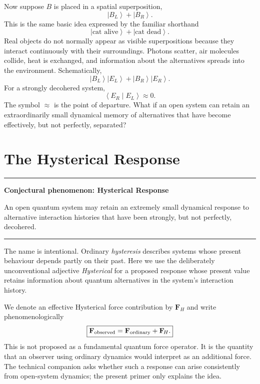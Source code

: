 \documentclass[11pt]{article}
\newcommand{\FH}{\mathbf F_{\!H}}
\newcommand{\ket}[1]{\left|#1\right\rangle}
\newcommand{\braket}[2]{\left\langle#1\middle|#2\right\rangle}
\newenvironment{plainbox}[1]{\begin{center}\begin{minipage}{0.91\textwidth}\hrule\vspace{0.55em}\textbf{#1}\par\smallskip}{\vspace{0.55em}\hrule\end{minipage}\end{center}}
\begin{document}
Now suppose $B$ is placed in a spatial superposition,
\begin{equation}
\ket{B_L}+\ket{B_R}.
\end{equation}
This is the same basic idea expressed by the familiar shorthand
\begin{equation}
\ket{\text{cat alive}}+\ket{\text{cat dead}}.
\end{equation}
Real objects do not normally appear as visible superpositions because they interact continuously with their surroundings. Photons scatter, air molecules collide, heat is exchanged, and information about the alternatives spreads into the environment. Schematically,
\begin{equation}
\ket{B_L}\ket{E_L}+\ket{B_R}\ket{E_R}.
\end{equation}
For a strongly decohered system,
\begin{equation}
\braket{E_R}{E_L}\approx0.
\end{equation}
The symbol $\approx$ is the point of departure. What if an open system can retain an extraordinarily small dynamical memory of alternatives that have become effectively, but not perfectly, separated?

\section{The Hysterical Response}
\begin{plainbox}{Conjectural phenomenon: Hysterical Response}
An open quantum system may retain an extremely small dynamical response to alternative interaction histories that have been strongly, but not perfectly, decohered.
\end{plainbox}

The name is intentional. Ordinary \emph{hysteresis} describes systems whose present behaviour depends partly on their past. Here we use the deliberately unconventional adjective \emph{Hysterical} for a proposed response whose present value retains information about quantum alternatives in the system's interaction history.

We denote an effective Hysterical force contribution by $\FH$ and write phenomenologically
\begin{equation}
\boxed{\mathbf F_{\rm observed}=\mathbf F_{\rm ordinary}+\FH.}
\end{equation}
This is not proposed as a fundamental quantum force operator. It is the quantity that an observer using ordinary dynamics would interpret as an additional force. The technical companion asks whether such a response can arise consistently from open-system dynamics; the present primer only explains the idea.
\end{document}
